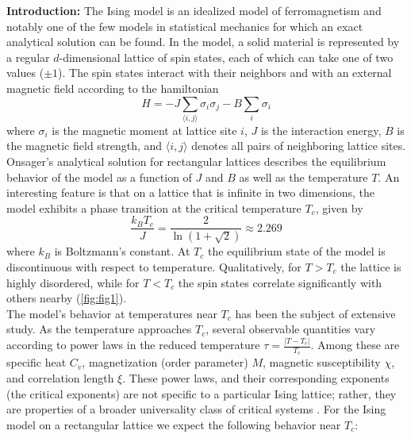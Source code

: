 \documentclass[letter,scriptaddress,twocolumn, prl]{revtex4}
\begin{document}
\textbf{Introduction:} The Ising model is an idealized model of ferromagnetism and notably one of the few models in statistical mechanics for which an exact analytical solution can be found. In the model, a solid material is represented by a regular $d$-dimensional lattice of spin states, each of which can take one of two values ($\pm 1$). The spin states interact with their neighbors and with an external magnetic field according to the hamiltonian
\begin{equation}
	H = -J \sum_{\langle i, j \rangle} \sigma_i \sigma_j - B \sum_i \sigma_i
\end{equation}
where $\sigma_i$ is the magnetic moment at lattice site $i$, $J$ is the interaction energy, $B$ is the magnetic field strength, and $\langle i, j \rangle$ denotes all pairs of neighboring lattice sites.\\
Onsager's analytical solution for rectangular lattices \cite{Onsager} describes the equilibrium behavior of the model as a function of $J$ and $B$ as well as the temperature $T$. An interesting feature is that on a lattice that is infinite in two dimensions, the model exhibits a phase transition at the critical temperature $T_c$, given by
\begin{equation}
	\label{eq:Tc}
	\frac{k_B T_c}{J} = \frac{2}{\ln{(1+\sqrt{2})}} \approx 2.269
\end{equation}
where $k_B$ is Boltzmann's constant. At $T_c$ the equilibrium state of the model is discontinuous with respect to temperature. Qualitatively, for $T > T_c$ the lattice is highly disordered, while for $T < T_c$ the spin states correlate significantly with others nearby (\autoref{fig:fig1}).\\
The model's behavior at temperatures near $T_c$ has been the subject of extensive study. As the temperature approaches $T_c$, several observable quantities vary according to power laws in the reduced temperature $\tau = \frac{|T - T_c|}{T_c}$. Among these are specific heat $C_v$, magnetization (order parameter) $M$, magnetic susceptibility $\chi$, and correlation length $\xi$. These power laws, and their corresponding exponents (the critical exponents) are not specific to a particular Ising lattice; rather, they are properties of a broader universality class of critical systems \cite{Stanley}. For the Ising model on a rectangular lattice we expect the following behavior near $T_c$:
\end{document}
